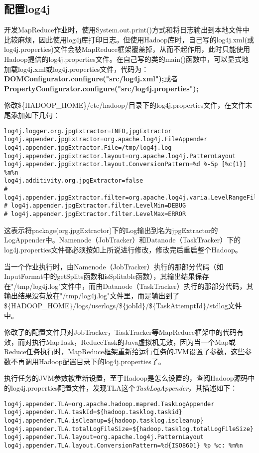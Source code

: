 \subsection{配置log4j}
开发MapReduce作业时，使用System.out.print()方式和将日志输出到本地文件中比较麻烦，因此使用log4j库打印日志。但使用Hadoop库时，自己写的log4j.xml(或log4j.properties)文件会被MapReduce框架覆盖掉，从而不起作用，此时只能使用Hadoop提供的log4j.properties文件。在自己写的类的main()函数中，可以显式地加载log4j.xml或log4j.properties文件，代码为：\textbf{DOMConfigurator.configure("src/log4j.xml");}或者\textbf{PropertyConfigurator.configure("src/log4j.properties");}
\par 修改\$\{HADOOP\_HOME\}/etc/hadoop/目录下的log4j.properties文件，在文件末尾添加如下几句：
\begin{verbatim}
log4j.logger.org.jpgExtractor=INFO,jpgExtractor
log4j.appender.jpgExtractor=org.apache.log4j.FileAppender
log4j.appender.jpgExtractor.File=/tmp/log4j.log
log4j.appender.jpgExtractor.layout=org.apache.log4j.PatternLayout
log4j.appender.jpgExtractor.layout.ConversionPattern=%d %-5p [%c{1}] %m%n
log4j.additivity.org.jpgExtractor=false
# log4j.appender.jpgExtractor.filter=org.apache.log4j.varia.LevelRangeFilter
# log4j.appender.jpgExtractor.filter.LevelMin=DEBUG
# log4j.appender.jpgExtractor.filter.LevelMax=ERROR
\end{verbatim}
\par 这表示将package(org.jpgExtractor)下的Log输出到名为jpgExtractor的LogAppender中。Namenode（JobTracker）和Datanode（TaskTracker）下的log4j.properties文件都必须按如上所说进行修改，修改完后重启整个Hadoop。
\par 当一个作业执行时，由Namenode（JobTracker）执行的那部分代码（如InputFormat中的getSplits函数和isSplitable函数），其输出结果保存在"/tmp/log4j.log"文件中，而由Datanode（TaskTracker）执行的那部分代码，其输出结果没有放在"/tmp/log4j.log"文件里，而是输出到了\$\{HADOOP\_HOME\}/logs/userlogs/\$\{jobId\}/\$\{TaskAttemptId\}/stdlog文件中。
\par 修改了的配置文件只对JobTracker，TaskTracker等MapReduce框架中的代码有效，而对执行MapTask，ReduceTask的Java虚拟机无效，因为当一个Map或Reduce任务执行时，MapReduce框架重新给运行任务的JVM设置了参数，这些参数不再调用Hadoop配置目录下的log4j.properties了。
\par 执行任务的JVM参数被重新设置，至于Hadoop是怎么设置的，查阅Hadoop源码中的log4j.properties配置文件，发现TLA这个\textsl{TaskLogAppender}，其描述如下：
\begin{verbatim}
log4j.appender.TLA=org.apache.hadoop.mapred.TaskLogAppender
log4j.appender.TLA.taskId=${hadoop.tasklog.taskid}
log4j.appender.TLA.isCleanup=${hadoop.tasklog.iscleanup}
log4j.appender.TLA.totalLogFileSize=${hadoop.tasklog.totalLogFileSize}
log4j.appender.TLA.layout=org.apache.log4j.PatternLayout
log4j.appender.TLA.layout.ConversionPattern=%d{ISO8601} %p %c: %m%n
\end{verbatim}
